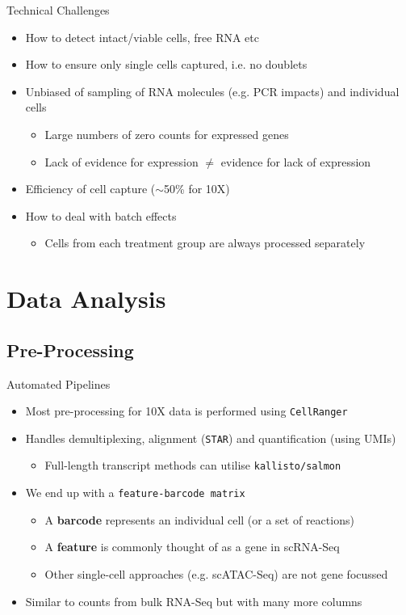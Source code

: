 \documentclass[aspectratio=169,11pt]{beamer}
\begin{document}
\begin{frame}{Technical Challenges}

	\begin{itemize}
		\item How to detect intact/viable cells, free RNA etc
		\item How to ensure only single cells captured, i.e. no doublets
		\item Unbiased of sampling of RNA molecules (e.g. PCR impacts) and individual cells
		\begin{itemize}
			\item Large numbers of zero counts for expressed genes
			\item Lack of evidence for expression $\neq$ evidence for lack of expression
		\end{itemize}
		\item Efficiency of cell capture ($\sim$50\% for 10X)
		\item How to deal with batch effects
		\begin{itemize}
			\item Cells from each treatment group are always processed separately
		\end{itemize}
	\end{itemize}

\end{frame}

\section{Data Analysis}

\subsection{Pre-Processing}

\begin{frame}{Automated Pipelines}
	\begin{itemize}
		\item Most pre-processing for 10X data is performed using \texttt{CellRanger}
		\item Handles demultiplexing, alignment (\texttt{STAR}) and quantification (using UMIs)
		\begin{itemize}
			\item Full-length transcript methods can utilise \texttt{kallisto/salmon}
		\end{itemize}
		\item We end up with a \texttt{feature-barcode matrix}
		\begin{itemize}
			\item A \textbf{barcode} represents an individual cell (or a set of reactions)
			\item A \textbf{feature} is commonly thought of as a gene in scRNA-Seq
			\item Other single-cell approaches (e.g. scATAC-Seq) are not gene focussed
		\end{itemize}
		\item Similar to counts from bulk RNA-Seq but with many more columns
	\end{itemize}
\end{frame}
\end{document}
